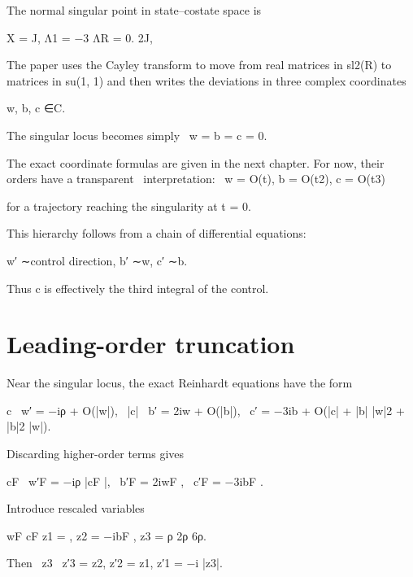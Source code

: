 The normal singular point in state–costate space is


\begin{displaytext}
X = J, Λ1 = −3 ΛR = 0. 2J,
\end{displaytext}

The paper uses the Cayley transform to move from real matrices in sl2(R) to matrices in su(1, 1) and then writes the deviations in three complex coordinates


w, b, c ∈C.


\begin{displaytext}
The singular locus becomes simply \
w = b = c = 0.
\end{displaytext}

\begin{displaytext}
The exact coordinate formulas are given in the next chapter. For now, their orders have a transparent \
interpretation: \
w = O(t), b = O(t2), c = O(t3)
\end{displaytext}

for a trajectory reaching the singularity at t = 0.


This hierarchy follows from a chain of differential equations:


w′ ∼control direction, b′ ∼w, c′ ∼b.


Thus c is effectively the third integral of the control.


\section{Leading-order truncation}

Near the singular locus, the exact Reinhardt equations have the form


\begin{displaytext}
c \
w′ = −iρ + O(|w|), \
|c| \
b′ = 2iw + O(|b|), \
c′ = −3ib + O(|c| + |b| |w|2 + |b|2 |w|).
\end{displaytext}

Discarding higher-order terms gives


\begin{displaytext}
cF \
w′F = −iρ |cF |, \
b′F = 2iwF , \
c′F = −3ibF .
\end{displaytext}

Introduce rescaled variables


\begin{displaytext}
wF cF z1 = , z2 = −ibF , z3 = ρ 2ρ 6ρ.
\end{displaytext}

\begin{displaytext}
Then \
z3 \
z′3 = z2, z′2 = z1, z′1 = −i |z3|.
\end{displaytext}

